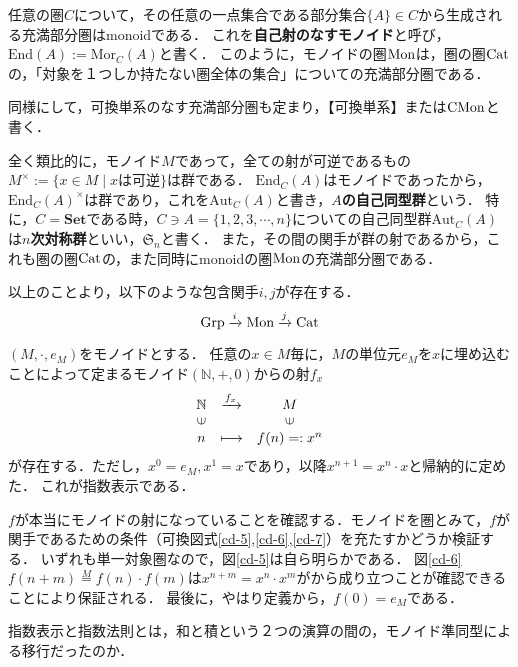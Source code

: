 \documentclass[uplatex, dvipdfmx]{jsreport}
\begin{document}
\begin{example}[単系の圏]
    任意の圏$C$について，その任意の一点集合である部分集合$\{ A\}\in C$から生成される充満部分圏はmonoidである．
    これを\textbf{自己射のなすモノイド}と呼び，$\mathrm{End}(A):=\mathrm{Mor}_C(A)$と書く．
    このように，モノイドの圏$\mathrm{Mon}$は，圏の圏$\mathrm{Cat}$の，「対象を１つしか持たない圏全体の集合」についての充満部分圏である．
\end{example}
\begin{example}[可換単系の圏]
    同様にして，可換単系のなす充満部分圏も定まり，【可換単系】または$\mathrm{CMon}$と書く．
\end{example}
\begin{example}[群の圏]
    全く類比的に，モノイド$M$であって，全ての射が可逆であるもの$M^\times :=\{ x\in M\mid xは可逆 \}$は群である．
    $\mathrm{End}_C(A)$はモノイドであったから，$\mathrm{End}_C(A)^\times$は群であり，これを$\mathrm{Aut}_C(A)$と書き，\textbf{$A$の自己同型群}という．
    特に，$C=\mathbf{Set}$である時，$C\ni A=\{ 1,2,3,\cdots,n \}$についての自己同型群$\mathrm{Aut}_C(A)$は\textbf{$n$次対称群}といい，$\mathfrak{S}_n$と書く．
    また，その間の関手が群の射であるから，これも圏の圏$\mathrm{Cat}$の，また同時にmonoidの圏$\mathrm{Mon}$の充満部分圏である．
\end{example}

以上のことより，以下のような包含関手$i,j$が存在する．
\[\mathrm{Grp}\xrightarrow{i}\mathrm{Mon}\xrightarrow{j}\mathrm{Cat}\]

\begin{example}
    $(M,\cdot, e_M)$をモノイドとする．
    任意の$x\in M$毎に，$M$の単位元$e_M$を$x$に埋め込むことによって定まるモノイド$(\mathbb{N},+,0)$からの射$f_x$
    \[\begin{array}{ccc}\mathbb{N}&\xrightarrow{f_x} &M\\ \rotatebox{90}{$\in$} & & \rotatebox{90}{$\in$} \\ n & \longmapsto & f(n)=:x^n \end{array}\]
    が存在する．ただし，$x^0 = e_M, x^1 = x$であり，以降$x^{n+1}=x^n\cdot x$と帰納的に定めた．
    これが指数表示である．
\end{example}
\begin{remark}
    $f$が本当にモノイドの射になっていることを確認する．モノイドを圏とみて，$f$が関手であるための条件（可換図式\ref{cd-5},\ref{cd-6},\ref{cd-7}）を充たすかどうか検証する．
    いずれも単一対象圏なので，図\ref{cd-5}は自ら明らかである．
    図\ref{cd-6}$f(n+m)\overset{M}{=}f(n)\cdot f(m)$は$x^{n+m}=x^n\cdot x^m$がから成り立つことが確認できることにより保証される．
    最後に，やはり定義から，$f(0)=e_M$である．
\end{remark}
指数表示と指数法則とは，和と積という２つの演算の間の，モノイド準同型による移行だったのか．
\end{document}
